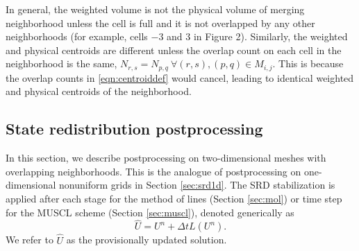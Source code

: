 In general, the weighted volume is not the physical volume of merging neighborhood 
unless the cell is full and it is not overlapped by any other neighborhoods 
(for example, cells $-3$ and $3$ in Figure 2).  Similarly, the weighted and physical 
centroids are different unless the overlap count on each cell in the neighborhood is the 
same, $N_{r,s} = N_{p,q} ~ \forall (r,s), (p,q) \in M_{i,j} $.  
This is because the overlap counts in \eqref{eqn:centroiddef} would cancel, leading to identical  weighted and physical 
centroids of the neighborhood.







\subsection{State redistribution postprocessing} \label{sec:srd_postprocessing}


In this section, we describe postprocessing on two-dimensional meshes with overlapping neighborhoods.
This is the analogue of postprocessing on one-dimensional nonuniform grids in Section \ref{sec:srd1d}.
The SRD stabilization is applied after each stage for the method of lines (Section \ref{sec:mol}) 
or time step for the MUSCL scheme (Section \ref{sec:muscl}), denoted generically as
\begin{equation} \label{eq:stage_step}
\widehat{U} = U^n + \Delta t  L(U^n).
\end{equation}
We refer to
$\widehat{U}$ as the provisionally updated solution.


